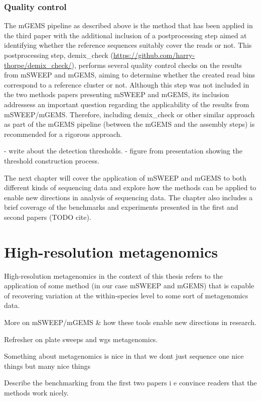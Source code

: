 \documentclass[officiallayout]{tktla}
\begin{document}
\subsection{Quality control}

The mGEMS pipeline as described above is the method that has been
applied in the third paper with the additional inclusion of a
postprocessing step aimed at identifying whether the reference
sequences suitably cover the reads or not. This postprocessing step,
demix\_check (\url{https://github.com/harry-thorpe/demix_check/}),
performs several quality control checks on the results from mSWEEP and
mGEMS, aiming to determine whether the created read bins correspond to
a reference cluster or not. Although this step was not included in the
two methods papers presenting mSWEEP and mGEMS, its inclusion
addressess an important question regarding the applicability of the
results from mSWEEP/mGEMS. Therefore, including demix\_check
\textemdash or other similar approach \textemdash as part of the mGEMS
pipeline (between the mGEMS and the assembly steps) is recommended for
a rigorous approach.

- write about the detection thresholds.
- figure from presentation showing the threshold construction process.

The next chapter will cover the application of mSWEEP and mGEMS to
both different kinds of sequencing data and explore how the methods
can be applied to enable new directions in analysis of sequencing
data. The chapter also includes a brief coverage of the benchmarks and
experiments presented in the first and second papers (TODO cite).

\chapter{High-resolution metagenomics}

High-resolution metagenomics in the context of this thesis refers to
the application of some method (in our case mSWEEP and mGEMS) that is
capable of recovering variation at the within-species level to some
sort of metagenomics data.

More on mSWEEP/mGEMS \& how these tools enable new directions in research.

Refresher on plate sweeps and wgs metagenomics.

Something about metagenomics is nice in that we dont just sequence one
nice things but many nice things

Describe the benchmarking from the first two papers i e convince readers that the methods work nicely.
\end{document}
